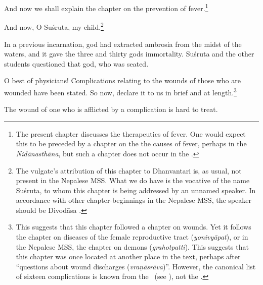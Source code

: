 \begin{translation}
    
    
    \item[1]  And now we shall explain the chapter on the prevention of 
    fever.\footnote{The present chapter discusses the therapeutics of fever. 
    One would expect this to be preceded by a chapter on the the causes of 
    fever, perhaps in the \emph{Nidānasthāna}, but such a chapter does not 
    occur in the \SS.}
    
    

    
    \item[3.1]  
    
    And now, O Suśruta, my child.\footnote{The vulgate's
    attribution of this chapter to Dhanvantari is, as usual, not
    present in the Nepalese MSS. What we do have is the vocative of
    the name Suśruta, to whom this chapter is being addressed by an
    unnamed speaker.  In accordance with other chapter-beginnings in the 
    Nepalese MSS, the speaker should be Divodāsa \citep{birc-2021}.}
    
    \item[3--5ab]  
    
In a previous incarnation, god had extracted ambrosia from the midst
of the waters, and it gave the three and thirty gods immortality. 
Suśruta and the other students questioned that god, who was seated.

O best of physicians! Complications relating to the wounds of those
who are wounded have been stated.  So now, declare it to us in brief
and at length.\footnote{This suggests that this chapter followed a
    chapter on wounds.  Yet it follows the chapter on diseases of the
    female reproductive tract (\emph{yonivyāpat}), or in the Nepalese
    MSS, the chapter on demons (\emph{grahotpatti}).  This suggests that
    this chapter was once located at another place in the text, perhaps
    after  “questions about wound discharges
    (\emph{vraṇāsrāva})”.  However, the canonical list of sixteen
    complications is known from the \CS\ (see 
    ), not the \SS.}
    
    
\item[5cd--6]    
 
The wound of one who is afflicted by a complication is hard to treat.
    

\end{translation}
